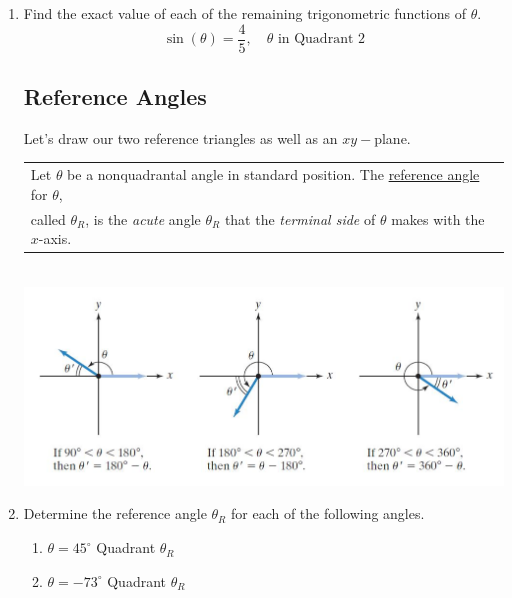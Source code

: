 \begin{enumerate}
\newpage

\item Find the exact value of each of the remaining trigonometric functions of $\theta$.
$$\sin(\theta)=\frac{4}{5}, \quad  \theta \text{ in Quadrant 2}$$\vfill


\subsection{Reference Angles} 

Let's draw our two reference triangles as well as an $xy-$plane.\\[1.5in]
\hspace{-.3in}\begin{tabular}{| l |} \hline
Let $\theta$ be a nonquadrantal angle in standard position. The \underline{reference angle} for $\theta$, \\ called $\theta_R$, is the \emph{acute} angle $\theta_R$ that the \emph{terminal side} of $\theta$ makes with the $x$-axis. \\ \hline
\end{tabular}\\
\includegraphics{refimage}\\

\newpage

\item Determine the reference angle $\theta_R$ for each of the following angles.
\begin{enumerate}
\item $\theta = 45^\circ$ \hspace{1in} Quadrant \underline{\phantom{sldkjfslkdjf}} \hspace{1in} $\theta_R$ \underline{\phantom{sldkjfslkdjf}} \\[.8in]
\item $\theta = -73^\circ$ \hspace{1in} Quadrant \underline{\phantom{sldkjfslkdjf}} \hspace{1in} $\theta_R$ \underline{\phantom{sldkjfslkdjf}}  \\[.8in]


\end{enumerate}
\end{enumerate}

